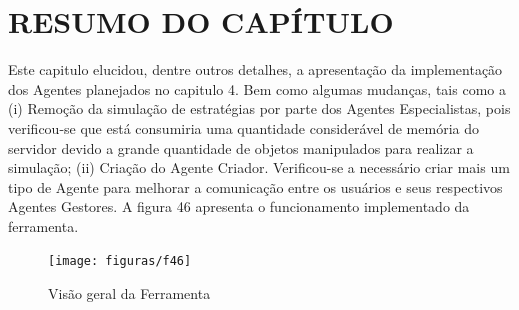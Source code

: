 \section{RESUMO DO CAPÍTULO}

Este capitulo elucidou, dentre outros detalhes, a apresentação da implementação dos Agentes planejados no capitulo 4. Bem como algumas mudanças, tais como a (i) Remoção da simulação de estratégias por parte dos Agentes Especialistas, pois verificou-se que está consumiria uma quantidade considerável de memória do servidor devido a grande quantidade de objetos manipulados para realizar a simulação; (ii) Criação do Agente Criador. Verificou-se a necessário criar mais um tipo de Agente para melhorar a comunicação entre os usuários e seus respectivos Agentes Gestores. A figura 46 apresenta o funcionamento implementado da ferramenta.


\begin{figure}[h]
\centering
\label{f46}
\texttt{[image: figuras/f46]}
\caption{Visão geral da Ferramenta}
\end{figure}






